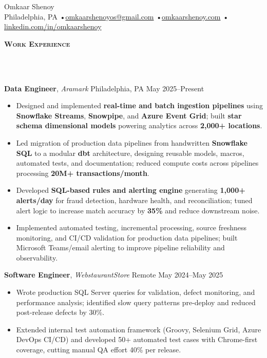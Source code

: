 \documentclass[10pt]{article}
\newcommand{\lineunder} {
    \vspace*{-10pt} \\
    \hspace*{-18pt} \hrulefill \\
    \vspace*{2pt}
}
\newcommand{\header} [1] {
  \vspace*{2pt}
    {\hspace*{-15pt}\textsc{#1}}
    \lineunder
}
\begin{document}
\begin{center}
  {\Huge Omkaar Shenoy} \\
  Philadelphia, PA \;•\;\href{mailto:omkaarshenoyos@gmail.com}{omkaarshenoyos@gmail.com} \;•\;\href{https://omkaarshenoy.com}{omkaarshenoy.com} \;•\;
  \href{https://www.linkedin.com/in/omkaarshenoy}{linkedin.com/in/omkaarshenoy} \\
\end{center}

\header{\textbf{Work Experience}}

\textbf{Data Engineer}, \textit{Aramark} \hfill Philadelphia, PA \textbar{} May 2025--Present\\
\begin{itemize}[leftmargin=5mm, itemsep=0mm]
  \item Designed and implemented \textbf{real-time and batch ingestion pipelines} using \textbf{Snowflake Streams}, \textbf{Snowpipe}, and \textbf{Azure Event Grid}; built \textbf{star schema dimensional models} powering analytics across \textbf{2{,}000+ locations}.
  \item Led migration of production data pipelines from handwritten \textbf{Snowflake SQL} to a modular \textbf{dbt} architecture, designing reusable models, macros, automated tests, and documentation; reduced compute costs across pipelines processing \textbf{20M+ transactions/month}.
  \item Developed \textbf{SQL-based rules and alerting engine} generating \textbf{1{,}000+ alerts/day} for fraud detection, hardware health, and reconciliation; tuned alert logic to increase match accuracy by \textbf{35\%} and reduce downstream noise.
  \item Implemented automated testing, incremental processing, source freshness monitoring, and CI/CD validation for production data pipelines; built Microsoft Teams/email alerting to improve pipeline reliability and observability.
\end{itemize}

\textbf{Software Engineer}, \textit{WebstaurantStore} \hfill Remote \textbar{} May 2024--May 2025\\
\begin{itemize}[leftmargin=5mm, itemsep=0mm]
  \item Wrote production SQL Server queries for validation, defect monitoring, and performance analysis; identified slow query patterns pre-deploy and reduced post-release defects by 30\%.
  \item Extended internal test automation framework (Groovy, Selenium Grid, Azure DevOps CI/CD) and developed 50+ automated test cases with Chrome-first coverage, cutting manual QA effort 40\% per release.
\end{itemize}
\end{document}
